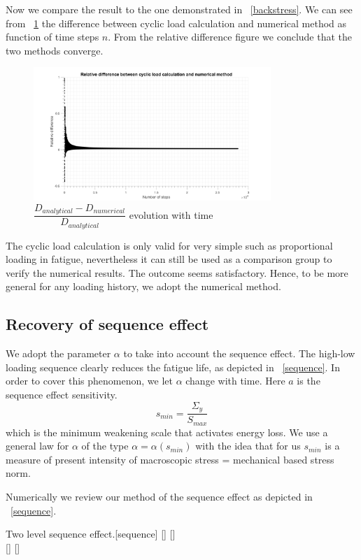 \documentclass[3p,times,number,review]{elsarticle}
\newcommand{\figref}[1]{\figurename~\ref{#1}}
\begin{document}
Now we compare the result to the one demonstrated in \figref{backstress}.  We can see from \figref{Damagediff}  the difference between cyclic load calculation and numerical method as function of time steps $n$. From the relative difference figure we conclude that the two methods converge.

\begin{figure}[!h]
	\centering
	\includegraphics[width=0.8\textwidth]{figures//Damagediff.png} 
	\caption{$\dfrac{D_{analytical}-D_{numerical}}{D_{analytical}}$ evolution with time}
	\label{Damagediff}
\end{figure}

The cyclic load calculation is only valid for very simple such as proportional loading in fatigue, nevertheless it can still be used as a comparison group to verify the numerical results. The outcome seems satisfactory. Hence, to be more general for any loading history, we adopt the numerical method.

\newpage
\subsection{Recovery of sequence effect}
We adopt the parameter $\alpha$ to take into account the sequence effect. The high-low loading sequence clearly reduces the fatigue life, as depicted in \figref{sequence}. In order to cover this phenomenon, we let $\alpha$ change with time. Here $a$ is the sequence effect sensitivity.
$$s_{min}=\dfrac{\Sigma_y}{S_{max}}$$
which is the minimum weakening scale that activates energy loss.  We use a general law for $\alpha$ of the type $\alpha = \alpha (s_{min})$ with the idea that for us $s_{min}$ is a measure of present intensity of macroscopic stress = mechanical based stress norm. 


Numerically we review our method of the sequence effect as depicted in \figref{sequence}.
\begin{Figure}[h!]{Two level sequence effect.}[sequence]
[]
[]
\\
[]
[]
\label{sequence}
\end{Figure}
\end{document}
